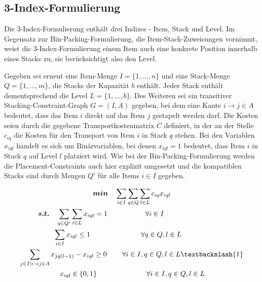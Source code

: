 \subsection{3-Index-Formulierung}
\label{sec:three_idx_formulation}

Die 3-Index-Formulierung enthält drei Indizes - Item, Stack und Level.
Im Gegensatz zur Bin-Packing-Formulierung, die Item-Stack-Zuweisungen vornimmt, weist die 3-Index-Formulierung einem
Item auch eine konkrete Position innerhalb eines Stacks zu, sie berücksichtigt also den Level.

Gegeben sei erneut eine Item-Menge $I = \{1, ..., n\}$ und eine Stack-Menge $Q = \{1, ..., m\}$, die Stacks der Kapazität $b$ enthält.
Jeder Stack enthält dementsprechend die Level $L = \{1, ..., b\}$. Des Weiteren sei ein transitiver Stacking-Constraint-Graph
$G = (I, A)$ gegeben, bei dem eine Kante $i \rightarrow j \in A$ bedeutet, dass das Item $i$ direkt auf das Item $j$ gestapelt werden darf.
Die Kosten seien durch die gegebene Transportkostenmatrix $C$ definiert, in der an der Stelle $c_{iq}$ die Kosten für den
Transport von Item $i$ in Stack $q$ stehen. Bei den Variablen $x_{iql}$ handelt es sich um Binärvariablen,
bei denen $x_{iql} = 1$ bedeutet, dass Item $i$ in Stack $q$ auf Level $l$ platziert wird. Wie bei der Bin-Packing-Formulierung
werden die Placement-Constraints auch hier explizit umgesetzt und die kompatiblen Stacks sind durch Mengen $Q^i$ für
alle Items $i \in I$ gegeben.

\begin{gather}
\boldsymbol{min} \quad \sum_{i \in I} \sum_{q \in Q} \sum_{l \in L} c_{iq} x_{iql} \label{three_idx_line_one} \\
\boldsymbol{s.t.} \quad \sum_{q \in Q^i} \sum_{l \in L} x_{iql} = 1 \quad\thinspace\thinspace\quad\quad\quad\quad \forall i \in I \thinspace\thinspace\quad\quad\quad\quad\quad\quad\quad\quad\thinspace\thinspace \label{three_idx_line_two} \\
\sum_{i \in I} x_{iql} \leq 1 \thinspace\quad\quad\quad\quad\quad\quad\quad \forall q \in Q, l \in L \thinspace\thinspace\thinspace\thinspace\quad\quad\quad\thinspace \label{three_idx_line_three} \\
\sum_{j \in I | i \rightarrow j \in A} x_{jq(l-1)} - x_{iql} \geq 0 \thinspace\quad\quad \forall i \in I, q \in Q, l \in L \textbackslash \{1\}
\label{three_idx_line_four} \\
\quad\quad x_{iql} \in \{0, 1\} \quad\quad\quad\quad\quad\quad\quad \forall i \in I, q \in Q, l \in L \quad\thinspace\thinspace\thinspace\thinspace\thinspace \label{three_idx_line_five}
\end{gather}

